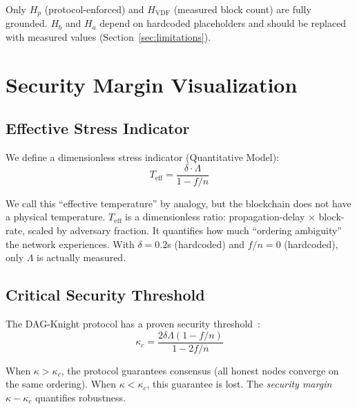 \documentclass[11pt,a4paper,twocolumn]{article}
\begin{document}
Only $H_p$ (protocol-enforced) and $H_{\text{VDF}}$ (measured block count) are fully grounded. $H_b$ and $H_a$ depend on hardcoded placeholders and should be replaced with measured values (Section~\ref{sec:limitations}).

\section{Security Margin Visualization}

\subsection{Effective Stress Indicator}

We define a dimensionless stress indicator (\textcolor{hardcoded}{Quantitative Model}):
\begin{equation}
T_{\text{eff}} = \frac{\delta \cdot \Lambda}{1 - f/n}
\label{eq:teff}
\end{equation}

\begin{honestybox}
We call this ``effective temperature'' by analogy, but the blockchain does not have a physical temperature. $T_{\text{eff}}$ is a dimensionless ratio: propagation-delay $\times$ block-rate, scaled by adversary fraction. It quantifies how much ``ordering ambiguity'' the network experiences. With $\delta = 0.2$s (hardcoded) and $f/n = 0$ (hardcoded), only $\Lambda$ is actually measured.
\end{honestybox}

\subsection{Critical Security Threshold}

The DAG-Knight protocol has a proven security threshold~\cite{dagknight,phantom}:
\begin{equation}
\kappa_c = \frac{2\delta\Lambda(1-f/n)}{1-2f/n}
\label{eq:critical}
\end{equation}

When $\kappa > \kappa_c$, the protocol guarantees consensus (all honest nodes converge on the same ordering). When $\kappa < \kappa_c$, this guarantee is lost. The \emph{security margin} $\kappa - \kappa_c$ quantifies robustness.
\end{document}
